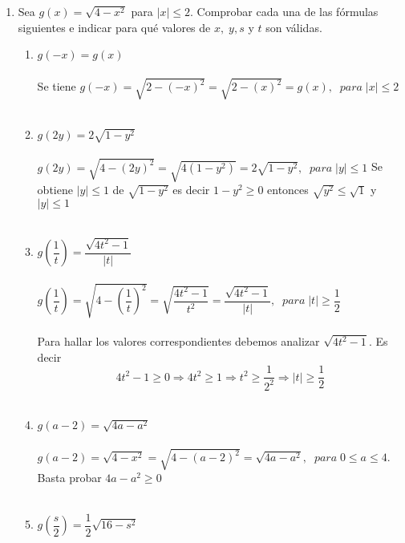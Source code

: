 \begin{enumerate}
        \item Sea $g(x) = \sqrt{4-x^2}$ para $|x| \leq 2$. Comprobar cada una de las fórmulas siguientes e indicar para qué valores de $x, \; y, s$ y $t$ son válidas.
            \begin{enumerate}[\bfseries (a)]
                \item $g(-x) = g(x)$\\\\
                Se tiene $g(-x)=\sqrt{2-(-x)^2} = \sqrt{2-(x)^2} = g(x), \; \; para \; |x| \leq 2$\\\\
                \item $g(2y) = 2\sqrt{1-y^2}$\\\\
                $g(2y)=\sqrt{4-(2y)^2}= \sqrt{4(1-y^2)} = 2 \sqrt{1-y^2}, \; \; para \; |y|\leq 1$ Se obtiene $|y| \leq 1$  de $\sqrt{1-y^2}$ es decir $1-y^2 \geq 0$ entonces $\sqrt{y^2} \leq \sqrt{1}$ \; y \; $|y|\leq 1$\\\\
                \item $g\left( \dfrac{1}{t} \right) = \dfrac{\sqrt{4t^2-1}}{|t|}$\\\\
                $g\left( \dfrac{1}{t} \right) = \sqrt{4 - \left( \dfrac{1}{t} \right)^2} = \sqrt{\dfrac{4t^2 - 1}{t^2}} =\dfrac{\sqrt{4t^2 - 1}}{|t|}, \; \; para \; |t| \geq \dfrac{1}{2}$\\\\
                Para hallar los valores correspondientes debemos analizar $\sqrt{4t^2 - 1}$. Es decir $$4t^2-1 \geq 0 \Rightarrow 4t^2 \geq 1 \Rightarrow t^2 \geq \dfrac{1}{2^2} \Rightarrow |t| \geq \dfrac{1}{2}$$\\
                \item $g(a-2) = \sqrt{4a-a^2}$\\\\
                $g(a-2) = \sqrt{4 - x^2} = \sqrt{4 - (a-2)^2} = \sqrt{4a - a^2}, \; \; para \; 0\leq a \leq 4.$ Basta probar  $4a-a^2 \geq 0$\\\\
                \item $g \left( \dfrac{s}{2} \right) = \dfrac{1}{2} \sqrt{16 - s^2}$\\\\

\end{enumerate}
\end{enumerate}

